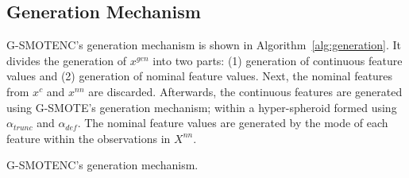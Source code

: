 \documentclass[preprint,12pt]{elsarticle}
\begin{document}
{\subsection{Generation Mechanism}

G-SMOTENC's generation mechanism is shown in Algorithm~\ref{alg:generation}.
It divides the generation of $x^{gen}$ into two parts: (1) generation of
continuous feature values and (2) generation of nominal feature values. Next,
the nominal features from $x^c$ and $x^{nn}$ are discarded. Afterwards, the
continuous features are generated using G-SMOTE's generation mechanism; within
a hyper-spheroid formed using $\alpha_{trunc}$ and $\alpha_{def}$. The nominal
feature values are generated by the mode of each feature within the
observations in $X^{nn}$.

\begin{algorithm}
    \caption{G-SMOTENC's generation mechanism.}\label{alg:generation}
    \DontPrintSemicolon%









\end{algorithm}}
\end{document}
